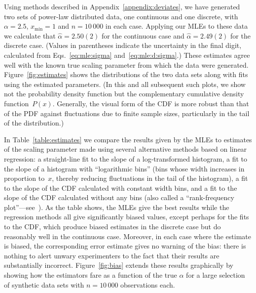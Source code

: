 \documentclass[final]{siamltex}
\newcommand{\Ord}{\mathrm{O}}
\newcommand{\xmin}{\ensuremath{x_{\min}}}
\newcommand{\edited}{\textbf}
\begin{document}
Using methods described in Appendix~\ref{appendix:deviates}, we have
generated two sets of power-law distributed data, one continuous and one
discrete, with~$\alpha=2.5$, $\xmin=1$ and $n=10\,000$ in each case.
Applying our MLEs to these data we calculate that \mbox{$\hat{\alpha} =
 2.50(2)$} for the continuous case and $\hat{\alpha} = 2.49(2)$ for the
discrete case.  (Values in parentheses indicate the uncertainty in the
final digit, calculated from Eqs.~\eqref{eq:mle:sigma}
and~\eqref{eq:mle:d:sigma}.)  These estimates agree well with the known
true scaling parameter from which the data were generated.
Figure~\ref{fig:estimates} shows the distributions of the two data sets
along with fits using the estimated parameters.  (In this and all
subsequent such plots, we show not the probability density function but the
complementary cumulative density function~$P(x)$.  Generally, the visual
form of the CDF is more robust than that of the PDF against fluctuations
due to finite sample sizes, particularly in the tail of the distribution.)

In Table~\ref{table:estimates} we compare the results given by the MLEs to
estimates of the scaling parameter made using several alternative methods
based on linear regression: a straight-line fit to the slope of a
log-transformed histogram, a fit to the slope of a histogram with
``logarithmic bins'' (bins whose width increases in proportion to~$x$,
thereby reducing fluctuations in the tail of the histogram), a fit to the
slope of the CDF calculated with constant width bins, and a fit to the
slope of the CDF calculated without any bins (also called a
``rank-frequency plot''---see~\cite{MEJN-on-power-laws}).  As the table
shows, the MLEs give the best results while the regression methods all give
significantly biased values, except perhaps for the fits to the CDF, which
produce biased estimates in the discrete case but do reasonably well in the
continuous case.  Moreover, in each case where the estimate is biased, the
corresponding error estimate gives no warning of the bias: there is nothing
to alert unwary experimenters to the fact that their results are
substantially incorrect.  Figure~\ref{fig:bias} extends these results
graphically by showing how the estimators fare as a function of the true
$\alpha$ for a large selection of synthetic data sets with $n=10\,000$
observations each.

\end{document}
